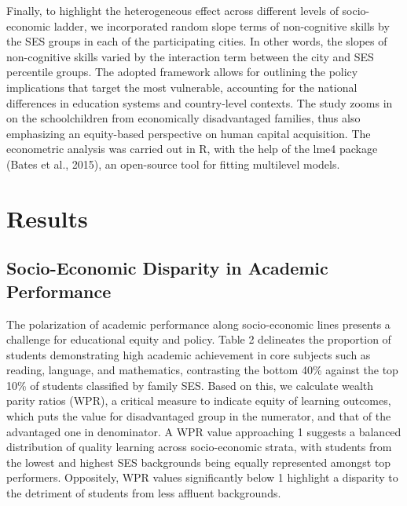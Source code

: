 \documentclass[
  12pt,
  a4paper,
]{article}
\begin{document}
Finally, to highlight the heterogeneous effect across different levels
of socio-economic ladder, we incorporated random slope terms of
non-cognitive skills by the SES groups in each of the participating
cities. In other words, the slopes of non-cognitive skills varied by the
interaction term between the city and SES percentile groups. The adopted
framework allows for outlining the policy implications that target the
most vulnerable, accounting for the national differences in education
systems and country-level contexts. The study zooms in on the
schoolchildren from economically disadvantaged families, thus also
emphasizing an equity-based perspective on human capital acquisition.
The econometric analysis was carried out in R, with the help of the lme4
package (Bates et al., 2015), an open-source tool for fitting multilevel
models.

\hypertarget{results}{%
\section{Results}\label{results}}

\hypertarget{socio-economic-disparity-in-academic-performance}{%
\subsection{Socio-Economic Disparity in Academic
Performance}\label{socio-economic-disparity-in-academic-performance}}

The polarization of academic performance along socio-economic lines
presents a challenge for educational equity and policy. Table 2
delineates the proportion of students demonstrating high academic
achievement in core subjects such as reading, language, and mathematics,
contrasting the bottom 40\% against the top 10\% of students classified
by family SES. Based on this, we calculate wealth parity ratios (WPR), a
critical measure to indicate equity of learning outcomes, which puts the
value for disadvantaged group in the numerator, and that of the
advantaged one in denominator. A WPR value approaching 1 suggests a
balanced distribution of quality learning across socio-economic strata,
with students from the lowest and highest SES backgrounds being equally
represented amongst top performers. Oppositely, WPR values significantly
below 1 highlight a disparity to the detriment of students from less
affluent backgrounds.
\end{document}
